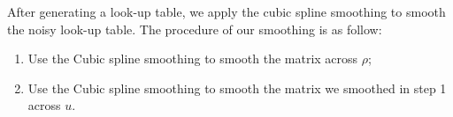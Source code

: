 \documentclass{article}
\begin{document}

After generating a look-up table, we apply the cubic spline smoothing to smooth the noisy look-up table. The procedure of our smoothing is as follow:
\begin{enumerate}
\item Use the Cubic spline smoothing to smooth the matrix across $\rho$;
\item Use the Cubic spline smoothing to smooth the matrix we smoothed in step 1 across $u$.
\end{enumerate}
\end{document}
